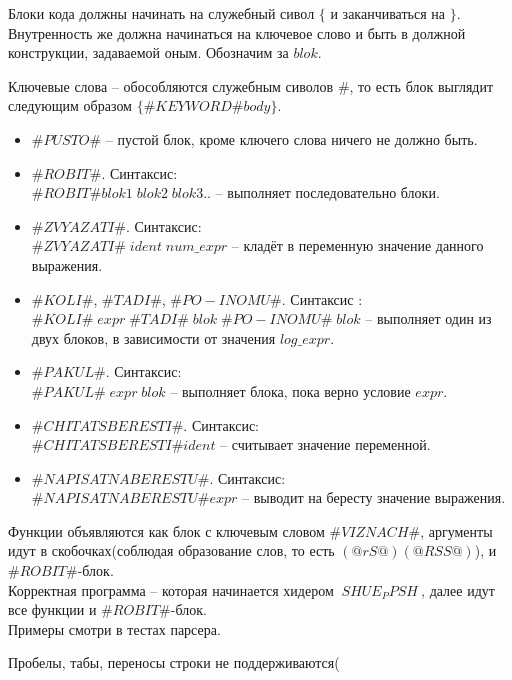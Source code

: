 \documentclass[12pt]{article}
\begin{document}
Блоки кода должны начинать на служебный сивол $\{$ и заканчиваться на $\}$. Внутренность же должна начинаться на ключевое слово и быть в должной конструкции, задаваемой оным. Обозначим за $blok$.

Ключевые слова -- обособляются служебным сиволов $\#$, то есть блок выглядит следующим образом $\{\#KEYWORD\#body\}$.
\begin{itemize}
\item $\#PUSTO\#$ -- пустой блок, кроме ключего слова ничего не должно быть.
\item $\#ROBIT\#$. Синтаксис:\\
$\#ROBIT\#blok1\;blok2\;blok3..$ -- выполняет последовательно блоки.
\item $\#ZVYAZATI\#$. Синтаксис:\\
$\#ZVYAZATI\#\;ident\;num\_expr$ -- кладёт в переменную значение данного выражения.
\item $\#KOLI\#$, $\#TADI\#$, $\#PO-INOMU\#$. Синтаксис :\\
 $\#KOLI\#\;expr\;\#TADI\#\;blok\;\#PO-INOMU\#\; blok$ -- выполняет один из двух блоков, в зависимости от значения $log\_expr$.
\item $\#PAKUL\#$. Синтаксис:\\
$\#PAKUL\#\;expr\;blok$ -- выполняет блока, пока верно условие $expr$.
\item $\#CHITATSBERESTI\#$. Синтаксис:\\
$\#CHITATSBERESTI\# ident$ -- считывает значение переменной.
\item $\#NAPISATNABERESTU\#$. Синтаксис:\\
$\#NAPISATNABERESTU\# expr$ -- выводит на бересту значение выражения.
\end{itemize}

Функции объявляются как блок с ключевым словом $\#VIZNACH\#$, аргументы идут в скобочках(соблюдая образование слов,  то есть $(@rS@)(@RSS@)$), и $\#ROBIT\#$-блок.\\

Корректная программа -- которая начинается хидером $~SHUE_PPSH~$, далее идут все функции и  $\#ROBIT\#$-блок.\\

Примеры смотри в тестах парсера.

Пробелы, табы, переносы строки не поддерживаются(
\end{document}
